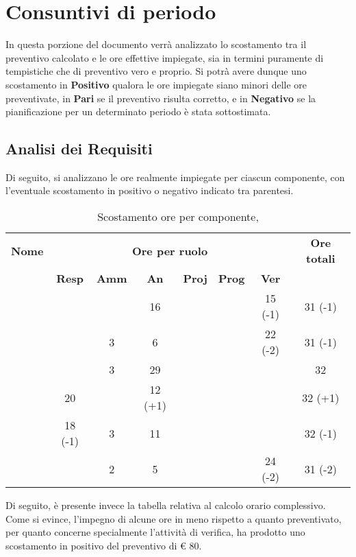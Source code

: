 \newpage

\section{Consuntivi di periodo}

In questa porzione del documento verrà analizzato lo scostamento tra il preventivo calcolato e le ore effettive impiegate, sia in termini puramente di tempistiche che di preventivo vero e proprio. Si potrà avere dunque uno scostamento in \textbf{Positivo} qualora le ore impiegate siano minori delle ore preventivate, in \textbf{Pari} se il preventivo risulta corretto, e in \textbf{Negativo} se la pianificazione per un determinato periodo è stata sottostimata.

\subsection{Analisi dei Requisiti}

Di seguito, si analizzano le ore realmente impiegate per ciascun componente, con l'eventuale scostamento in positivo o negativo indicato tra parentesi.

\begin{table}[H]
	\begin{center}
		\begin{tabular}{|c|c|c|c|c|c|c|c|}
			\hline
			\textbf{Nome} & \multicolumn{6}{c|}{\textbf{Ore per ruolo}} & \textbf{Ore totali} \\\cline{2-7}
			& \textbf{Resp} & \textbf{Amm} & \textbf{An} & \textbf{Proj} & \textbf{Prog} & \textbf{Ver} & \\
			\hline
			\MC			&		&		&	16	&		&		&	15 (-1)	&	31 (-1)	\\
			\hline
			\AN			&		&	3	&	6	&	 	&		&	22 (-2)	& 	31 (-1)	\\
			\hline
			\DAN		&		&	3	&	29 	&		&		&		&	32	\\
			\hline
			\AS			&	20	&	 	&	12 (+1) 	&		&	 	& 		&	32 (+1)	\\
			\hline
			\NS 		&	18 (-1)	&	3	&	11	&		&		& 		&	32 (-1)	\\
			\hline
			\DS			& 		&	2	&	5	&		&		&	24 (-2)	&	31 (-2)	\\
			\hline
		\end{tabular}
	\end{center}
	\caption{Scostamento ore per componente, \AdR}
\end{table}

Di seguito, è presente invece la tabella relativa al calcolo orario complessivo. Come si evince, l'impegno di alcune ore in meno rispetto a quanto preventivato, per quanto concerne specialmente l'attività di verifica, ha prodotto uno scostamento in positivo del preventivo di € 80.

